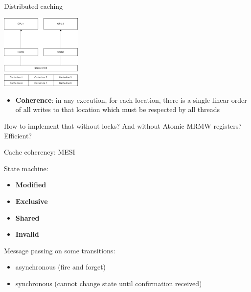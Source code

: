 \begin{frame}{Distributed caching}

\begin{center}
  \includegraphics[width=0.3\textwidth]{./pics/processor/cache.png}
\end{center}

\begin{itemize}
    \item \textbf{Coherence}: in any execution, for each location, there is a single linear order of all writes to that location which must be respected by all threads
\end{itemize}

\pause

How to implement that without locks? \pause And without Atomic MRMW registers? \pause Efficient?

\end{frame}


\begin{frame}{Cache coherency: MESI}



State machine:
\begin{itemize}
    \item \textbf{Modified}
    \item \textbf{Exclusive}
    \item \textbf{Shared}
    \item \textbf{Invalid}
\end{itemize}

Message passing on some transitions:
\begin{itemize}
    \item asynchronous (fire and forget)
    \item synchronous (cannot change state until confirmation received)
\end{itemize}


\end{frame}


